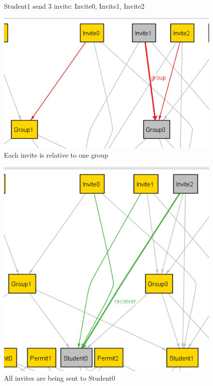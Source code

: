 \documentclass{article}
\begin{document}
{\begin{figure}[H]
    \caption{Student1 send 3 invite: Invite0, Invite1, Invite2}
    \label{fig:sending invite}
\end{figure}
\begin{figure}[H]
    \centering
    \includegraphics{images/ALLOY/group.png}
    \caption{Each invite is relative to one group}
    \label{fig:group invite}
\end{figure}
\begin{figure}[H]
    \centering
    \includegraphics[scale=0.85]{images/ALLOY/receiver.png}
    \caption{All invites are being sent to Student0}
    \label{fig:receiving invite}

\end{figure}}
\end{document}
